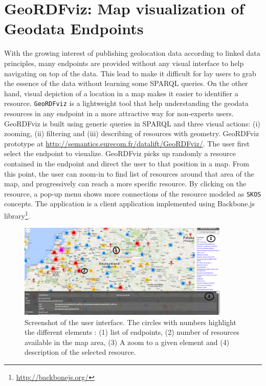 \section{GeoRDFviz: Map visualization of Geodata Endpoints}
\label{sec:geordfviz}

With the growing interest of publishing geolocation data according to linked data principles, many endpoints are provided without any visual interface to help navigating on top of the data. This lead to make it difficult for lay users to grab the essence of the data without learning some SPARQL queries. On the other hand, visual depiction of a location in a map makes it easier to identifier a resource. \texttt{GeoRDFviz} is a lightweight tool that help understanding the geodata resources  in any endpoint in a more attractive way for non-experts users. GeoRDFviz is built using generic queries in SPARQL and three visual actions: (i) zooming, (ii) filtering and (iii) describing of resources with geometry. GeoRDFviz prototype at \url{http://semantics.eurecom.fr/datalift/GeoRDFviz/}.
The user first select the endpoint to visualize. GeoRDFviz picks up randomly a resource contained in the endpoint and direct the user to that position in a map. From this point, the user can zoom-in to find list of resources around that area of the map, and progressively can reach a more specific resource. By clicking on the resource, a pop-up menu shows more connections of the resource modeled as \texttt{SKOS} concepts. The application is a client application implemented using Backbone.js library\footnote{\url{http://backbonejs.org/}}.

\begin{figure}[!htbp]
\begin{center}
\includegraphics[width=0.9\textwidth]{img/geoRDFvizpic_1200x.png}
\caption{Screenshot of the user interface. The circles with numbers highlight the different elements : (1) list of endpoints, (2) number of resources available in the map area, (3) A zoom to a given element and (4) description of the selected resource.}
\label{fig:geoviz-ui}
\end{center}
\end{figure}

